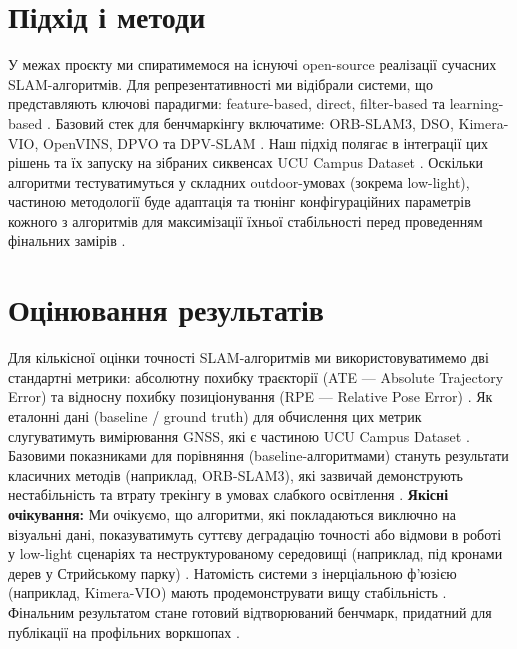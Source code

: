 \documentclass[ukrainian]{ucuproposal}
\begin{document}
\section{Підхід і методи}
У межах проєкту ми спиратимемося на існуючі open-source реалізації сучасних
SLAM-алгоритмів. Для репрезентативності ми відібрали системи, що
представляють ключові парадигми: feature-based, direct, filter-based
та learning-based \cite{ucu_slam_previous_team_2025}. 
Базовий стек для бенчмаркінгу включатиме: ORB-SLAM3, DSO, Kimera-VIO,
OpenVINS, DPVO та DPV-SLAM \cite{ucu_slam_previous_team_2025}. Наш підхід
полягає в інтеграції цих рішень та їх запуску на зібраних сиквенсах UCU Campus
Dataset \cite{ucu_slam_topic_2026}. Оскільки алгоритми тестуватимуться у складних
outdoor-умовах (зокрема low-light), частиною методології буде
адаптація та тюнінг конфігураційних параметрів кожного з алгоритмів
для максимізації їхньої стабільності перед проведенням фінальних
замірів \cite{ucu_slam_topic_2026, ucu_slam_previous_team_2025}.

\section{Оцінювання результатів}
Для кількісної оцінки точності SLAM-алгоритмів ми використовуватимемо дві
стандартні метрики: абсолютну похибку траєкторії (ATE — Absolute
Trajectory Error) та відносну похибку позиціонування (RPE — Relative Pose Error) \cite{ucu_slam_topic_2026, ucu_slam_previous_team_2025}. 
Як еталонні дані (baseline / ground truth) для обчислення цих метрик
слугуватимуть вимірювання GNSS, які є частиною UCU Campus Dataset
\cite{ucu_slam_topic_2026}. Базовими показниками для порівняння
(baseline-алгоритмами) стануть результати класичних методів
(наприклад, ORB-SLAM3), які зазвичай демонструють нестабільність
та втрату трекінгу в умовах слабкого освітлення \cite{ucu_slam_previous_team_2025}.
\textbf{Якісні очікування:} 
Ми очікуємо, що алгоритми, які покладаються виключно на візуальні
дані, показуватимуть суттєву деградацію точності або відмови в
роботі у low-light сценаріях та неструктурованому середовищі
(наприклад, під кронами дерев у Стрийському парку)
\cite{ucu_slam_topic_2026, ucu_slam_previous_team_2025}. Натомість
системи з інерціальною ф'юзією (наприклад, Kimera-VIO) мають
продемонструвати вищу стабільність \cite{ucu_slam_previous_team_2025}.
Фінальним результатом стане готовий відтворюваний бенчмарк, придатний
для публікації на профільних воркшопах \cite{ucu_slam_topic_2026}.
\end{document}
